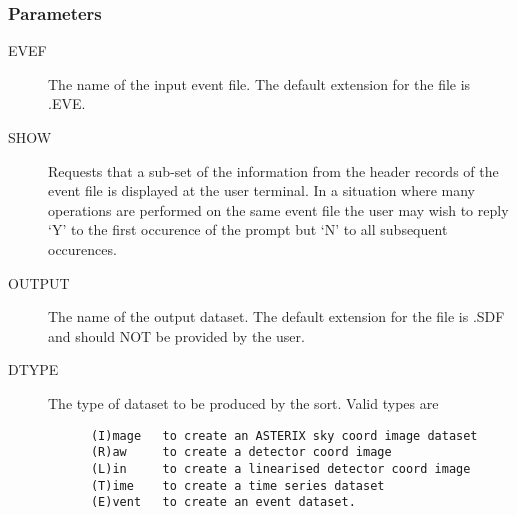 \subsubsection{Parameters}
\begin{description}
\item[EVEF]
The name of the input event file.
The default extension for the file is .EVE.
\item[SHOW]
Requests that a sub-set of the information from the header records of the
event file is displayed at the user terminal. In a situation where many
operations are performed on the same event file the user may wish to 
reply `Y' to the first occurence of the prompt but `N' to all subsequent
occurences.
\item[OUTPUT]
The name of the output dataset. The default extension for the file is 
.SDF and should NOT be provided by the user.
\item[DTYPE]
The type of dataset to be produced by the sort. Valid types are

\begin{verbatim}
      (I)mage   to create an ASTERIX sky coord image dataset
      (R)aw     to create a detector coord image
      (L)in     to create a linearised detector coord image
      (T)ime    to create a time series dataset
      (E)vent   to create an event dataset.
\end{verbatim}


\end{description}
